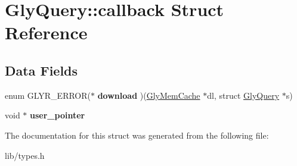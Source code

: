 \hypertarget{structGlyQuery_1_1callback}{
\section{GlyQuery::callback Struct Reference}
\label{structGlyQuery_1_1callback}
}
\subsection*{Data Fields}
\begin{DoxyCompactItemize}
\item 
\hypertarget{structGlyQuery_1_1callback_a146af653c1910ea0bc7c1bb0321385ed}{
enum GLYR\_\-ERROR($\ast$ {\bfseries download} )(\hyperlink{structGlyMemCache}{GlyMemCache} $\ast$dl, struct \hyperlink{structGlyQuery}{GlyQuery} $\ast$s)}
\label{structGlyQuery_1_1callback_a146af653c1910ea0bc7c1bb0321385ed}

\item 
\hypertarget{structGlyQuery_1_1callback_ad0a34f522ee2ce591eca581644fef0b2}{
void $\ast$ {\bfseries user\_\-pointer}}
\label{structGlyQuery_1_1callback_ad0a34f522ee2ce591eca581644fef0b2}

\end{DoxyCompactItemize}


The documentation for this struct was generated from the following file:\begin{DoxyCompactItemize}
\item 
lib/types.h\end{DoxyCompactItemize}
